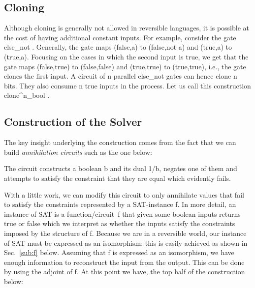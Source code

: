 \documentclass[preprint]{sigplanconf}
\begin{document}
\subsection{Cloning}

Although cloning is generally not allowed in reversible languages, it is
possible at the cost of having additional constant inputs. For example,
consider the gate {{else_{not} }}. Generally, the gate maps
{{(false,a)}} to {{(false,not a)}} and {{(true,a)}} to {{(true,a)}}. Focusing
on the cases in which the second input is {{true}}, we get that the gate maps
{{(false,true)}} to {{(false,false)}} and {{(true,true)}} to {{(true,true)}},
i.e., the gate clones the first input. A circuit of {{n}} parallel
{{else_{not} }} gates can hence clone {{n}} bits.  They also consume {{n}}
{{true}} inputs in the process.  Let us call this construction
{{clone^n_{bool} }}.

\subsection{Construction of the Solver}

The key insight underlying the construction comes from the fact that we can
build \emph{annihilation circuits} such as the one below:

\begin{center}
\end{center}
The circuit constructs a boolean {{b}} and its dual {{1/b}}, negates one of
them and attempts to satisfy the constraint that they are equal which
evidently fails. 

With a little work, we can modify this circuit to only annihilate values that
fail to satisfy the constraints represented by a SAT-instance {{f}}. In more
detail, an instance of SAT is a function/circuit~{{f}} that given some
boolean inputs returns {{true}} or {{false}} which we interpret as whether
the inputs satisfy the constraints imposed by the structure of {{f}}. Because
we are in a reversible world, our instance of SAT must be expressed as an
isomorphism: this is easily achieved as shown in Sec.~\ref{sub:f}
below. Assuming that {{f}} is expressed as an isomorphism, we have enough
information to reconstruct the input from the output. This can be done by
using the adjoint of {{f}}. At this point we have, the top half of the
construction below:
\end{document}
